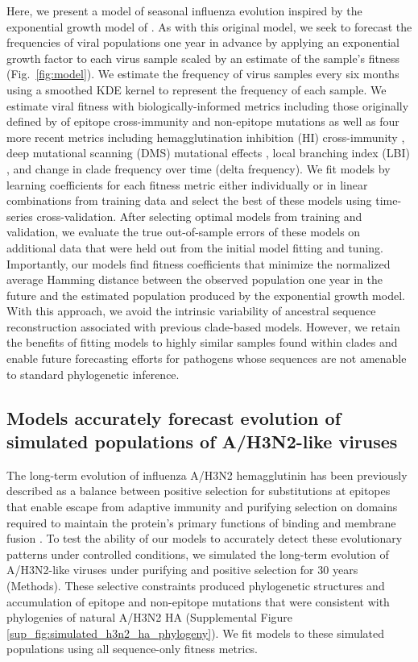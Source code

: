 Here, we present a model of seasonal influenza evolution inspired by the exponential growth model of \cite{Luksza:2014hj}.
As with this original model, we seek to forecast the frequencies of viral populations one year in advance by applying an exponential growth factor to each virus sample scaled by an estimate of the sample's fitness (Fig.~\ref{fig:model}).
We estimate the frequency of virus samples every six months using a smoothed KDE kernel to represent the frequency of each sample.
We estimate viral fitness with biologically-informed metrics including those originally defined by \cite{Luksza:2014hj} of epitope cross-immunity and non-epitope mutations as well as four more recent metrics including hemagglutination inhibition (HI) cross-immunity \cite{Neher:2016hy}, deep mutational scanning (DMS) mutational effects \cite{Lee2018}, local branching index (LBI) \cite{Neher:2014eu}, and change in clade frequency over time (delta frequency).
We fit models by learning coefficients for each fitness metric either individually or in linear combinations from training data and select the best of these models using time-series cross-validation.
After selecting optimal models from training and validation, we evaluate the true out-of-sample errors of these models on additional data that were held out from the initial model fitting and tuning.
Importantly, our models find fitness coefficients that minimize the normalized average Hamming distance between the observed population one year in the future and the estimated population produced by the exponential growth model.
With this approach, we avoid the intrinsic variability of ancestral sequence reconstruction associated with previous clade-based models.
However, we retain the benefits of fitting models to highly similar samples found within clades and enable future forecasting efforts for pathogens whose sequences are not amenable to standard phylogenetic inference.

\subsection*{Models accurately forecast evolution of simulated populations of {A/H3N2-like viruses}}

The long-term evolution of influenza A/H3N2 hemagglutinin has been previously described as a balance between positive selection for substitutions at epitopes that enable escape from adaptive immunity and purifying selection on domains required to maintain the protein's primary functions of binding and membrane fusion \cite{Bush:1999vj,Neher2013,Luksza:2014hj,Koelle:2015dh}.
To test the ability of our models to accurately detect these evolutionary patterns under controlled conditions, we simulated the long-term evolution of A/H3N2-like viruses under purifying and positive selection for 30 years (Methods).
These selective constraints produced phylogenetic structures and accumulation of epitope and non-epitope mutations that were consistent with phylogenies of natural A/H3N2 HA (Supplemental Figure \ref{sup_fig:simulated_h3n2_ha_phylogeny}).
We fit models to these simulated populations using all sequence-only fitness metrics.

